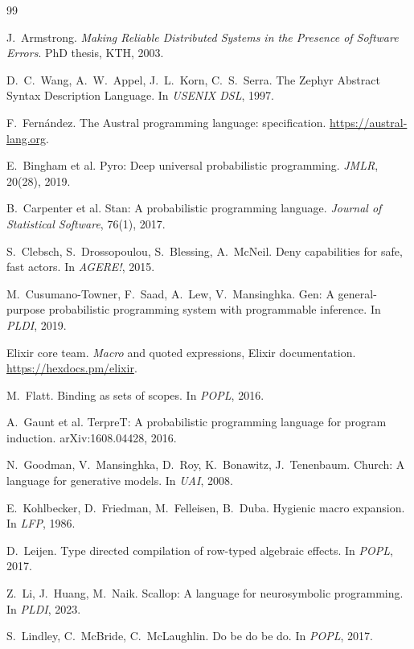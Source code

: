 \documentclass[11pt]{article}
\begin{document}
\begin{thebibliography}{99}\small

 J.~Armstrong. \emph{Making Reliable Distributed Systems in the Presence of Software Errors}. PhD thesis, KTH, 2003.

 D.~C.~Wang, A.~W.~Appel, J.~L.~Korn, C.~S.~Serra. The Zephyr Abstract Syntax Description Language. In \emph{USENIX DSL}, 1997.

 F.~Fern\'andez. The Austral programming language: specification. \url{https://austral-lang.org}.

 E.~Bingham et al. Pyro: Deep universal probabilistic programming. \emph{JMLR}, 20(28), 2019.

 B.~Carpenter et al. Stan: A probabilistic programming language. \emph{Journal of Statistical Software}, 76(1), 2017.

 S.~Clebsch, S.~Drossopoulou, S.~Blessing, A.~McNeil. Deny capabilities for safe, fast actors. In \emph{AGERE!}, 2015.

 M.~Cusumano-Towner, F.~Saad, A.~Lew, V.~Mansinghka. Gen: A general-purpose probabilistic programming system with programmable inference. In \emph{PLDI}, 2019.

 Elixir core team. \emph{Macro} and quoted expressions, Elixir documentation. \url{https://hexdocs.pm/elixir}.

 M.~Flatt. Binding as sets of scopes. In \emph{POPL}, 2016.

 A.~Gaunt et al. TerpreT: A probabilistic programming language for program induction. arXiv:1608.04428, 2016.

 N.~Goodman, V.~Mansinghka, D.~Roy, K.~Bonawitz, J.~Tenenbaum. Church: A language for generative models. In \emph{UAI}, 2008.

 E.~Kohlbecker, D.~Friedman, M.~Felleisen, B.~Duba. Hygienic macro expansion. In \emph{LFP}, 1986.

 D.~Leijen. Type directed compilation of row-typed algebraic effects. In \emph{POPL}, 2017.

 Z.~Li, J.~Huang, M.~Naik. Scallop: A language for neurosymbolic programming. In \emph{PLDI}, 2023.

 S.~Lindley, C.~McBride, C.~McLaughlin. Do be do be do. In \emph{POPL}, 2017.


\end{thebibliography}
\end{document}
